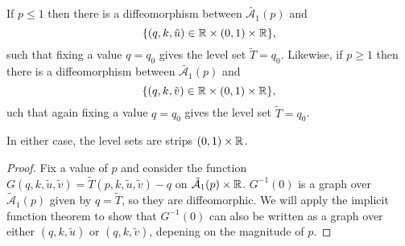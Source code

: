 \begin{lem}
\label{lem:T_graph}
If $p \leq 1$ then there is a diffeomorphism between $\tilde{\mathcal{A}_1}(p)$ and
\[
\{(q,k,\tilde{u}) \in \R\times(0,1)\times\R \},
\]
such that fixing a value $q=q_0$ gives the level set $\tilde{T} = q_0$. Likewise, if $p \geq 1$ then there is a diffeomorphism between $\tilde{\mathcal{A}_1}(p)$ and
\[
\{(q,k,\tilde{v}) \in \R\times(0,1)\times\R \},
\]
uch that again fixing a value $q=q_0$ gives the level set $\tilde{T} = q_0$.

In either case, the level sets are strips $(0,1)\times \R$.

\begin{proof}
Fix a value of $p$ and consider the function $G(q, k,\tilde{u},\tilde{v}) = \tilde{T}(p,k,\tilde{u},\tilde{v}) - q$ on $\mathcal{\tilde{A}}_1(p)\times\R$. $G^{-1}(0)$ is a graph over $\mathcal{\tilde{A}}_1(p)$ given by $q=\tilde{T}$, so they are diffeomorphic. We will apply the implicit function theorem to show that $G^{-1}(0)$ can also be written as a graph over either $(q,k,\tilde{u})$ or $(q,k,\tilde{v})$, depening on the magnitude of $p$.


\end{proof}
\end{lem}
